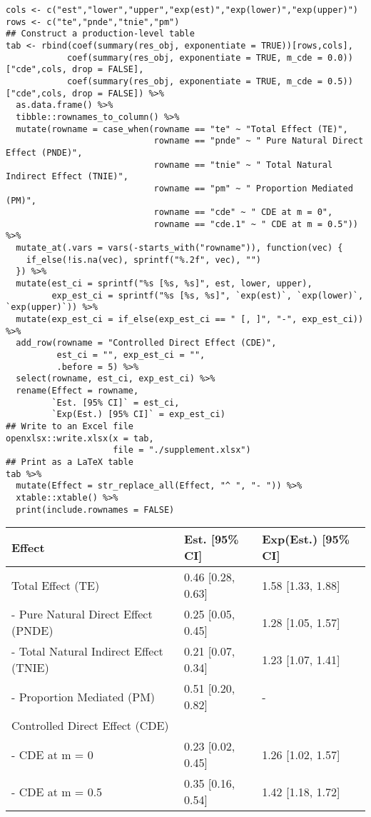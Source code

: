\documentclass[dvipdfmx,10pt]{article}
\begin{document}
\scriptsize
\begin{verbatim}
cols <- c("est","lower","upper","exp(est)","exp(lower)","exp(upper)")
rows <- c("te","pnde","tnie","pm")
## Construct a production-level table
tab <- rbind(coef(summary(res_obj, exponentiate = TRUE))[rows,cols],
            coef(summary(res_obj, exponentiate = TRUE, m_cde = 0.0))["cde",cols, drop = FALSE],
            coef(summary(res_obj, exponentiate = TRUE, m_cde = 0.5))["cde",cols, drop = FALSE]) %>%
  as.data.frame() %>%
  tibble::rownames_to_column() %>%
  mutate(rowname = case_when(rowname == "te" ~ "Total Effect (TE)",
                             rowname == "pnde" ~ " Pure Natural Direct Effect (PNDE)",
                             rowname == "tnie" ~ " Total Natural Indirect Effect (TNIE)",
                             rowname == "pm" ~ " Proportion Mediated (PM)",
                             rowname == "cde" ~ " CDE at m = 0",
                             rowname == "cde.1" ~ " CDE at m = 0.5")) %>%
  mutate_at(.vars = vars(-starts_with("rowname")), function(vec) {
    if_else(!is.na(vec), sprintf("%.2f", vec), "")
  }) %>%
  mutate(est_ci = sprintf("%s [%s, %s]", est, lower, upper),
         exp_est_ci = sprintf("%s [%s, %s]", `exp(est)`, `exp(lower)`, `exp(upper)`)) %>%
  mutate(exp_est_ci = if_else(exp_est_ci == " [, ]", "-", exp_est_ci)) %>%
  add_row(rowname = "Controlled Direct Effect (CDE)",
          est_ci = "", exp_est_ci = "",
          .before = 5) %>%
  select(rowname, est_ci, exp_est_ci) %>%
  rename(Effect = rowname,
         `Est. [95% CI]` = est_ci,
         `Exp(Est.) [95% CI]` = exp_est_ci)
## Write to an Excel file
openxlsx::write.xlsx(x = tab,
                     file = "./supplement.xlsx")
## Print as a LaTeX table
tab %>%
  mutate(Effect = str_replace_all(Effect, "^ ", "- ")) %>%
  xtable::xtable() %>%
  print(include.rownames = FALSE)
\end{verbatim}

\begin{table}[ht]
\centering
\begin{tabular}{lll}
  \hline
Effect & Est. [95\% CI] & Exp(Est.) [95\% CI] \\ 
  \hline
Total Effect (TE) & 0.46 [0.28, 0.63] & 1.58 [1.33, 1.88] \\ 
  - Pure Natural Direct Effect (PNDE) & 0.25 [0.05, 0.45] & 1.28 [1.05, 1.57] \\ 
  - Total Natural Indirect Effect (TNIE) & 0.21 [0.07, 0.34] & 1.23 [1.07, 1.41] \\ 
  - Proportion Mediated (PM) & 0.51 [0.20, 0.82] & - \\ 
  Controlled Direct Effect (CDE) &  &  \\ 
  - CDE at m = 0 & 0.23 [0.02, 0.45] & 1.26 [1.02, 1.57] \\ 
  - CDE at m = 0.5 & 0.35 [0.16, 0.54] & 1.42 [1.18, 1.72] \\ 
   \hline
\end{tabular}
\end{table}
\end{document}
